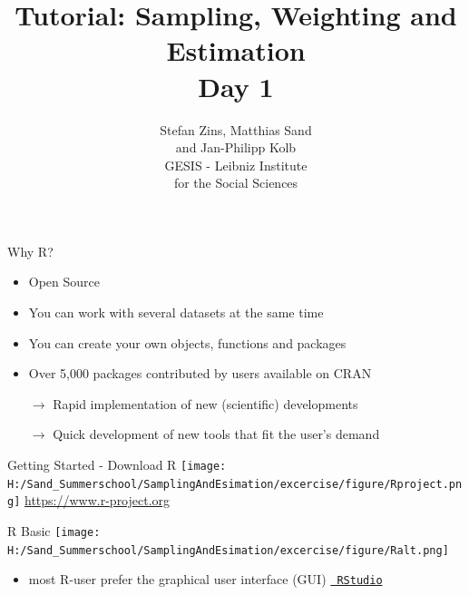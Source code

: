 \documentclass[11pt,german,hideothersubsections]{beamer}
\title[Day 1]{Tutorial: Sampling, Weighting and Estimation\\ \Large{Day 1} }
\author[M. Sand]{Stefan Zins, Matthias Sand\\ and Jan-Philipp Kolb\\ \vspace{.5cm} \footnotesize{GESIS - Leibniz Institute\\ for the Social Sciences}}
\date[]{\color{dunkelgrau}\footnotesize%
\begin{minipage}{8cm}%
\begin{center}%
\scriptsize{
\textbf{GESIS Summer School}\\ \tiny{Cologne, Germany}%
}\\
\vspace{0.25cm}
\textbf{August 24th, 2015}%

\end{center}%
\end{minipage}}%
\newcommand{\R}[1]{{\tt \color{blue}  #1}}
\begin{document}

\maketitle



\begin{frame}[fragile]{Why R?}
\begin{itemize}
\item Open Source 
\vspace{.25cm}
\item You can work with several datasets at the same time
\vspace{.25cm}
\item You can create your own objects, functions and packages
\vspace{.25cm}
\item Over 5,000 packages contributed by users available on CRAN
\vspace{.25cm}
\item[$\rightarrow$] Rapid implementation of new (scientific) developments
\vspace{.25cm}
\item[$\rightarrow$] Quick development of new tools that fit the user's demand
\end{itemize}
\end{frame}
\begin{frame}[fragile]{Getting Started - Download R}
\texttt{[image: H:/Sand\_Summerschool/SamplingAndEsimation/excercise/figure/Rproject.png]}
\vspace{.5cm}
\centering
\url{https://www.r-project.org}

\end{frame}
\begin{frame}[fragile]{R Basic}
\texttt{[image: H:/Sand\_Summerschool/SamplingAndEsimation/excercise/figure/Ralt.png]}
\begin{itemize}
\item most R-user prefer the graphical user interface (GUI) \href{https://www.rstudio.com}{\R{RStudio}}
\end{itemize}
\end{frame}
\end{document}
